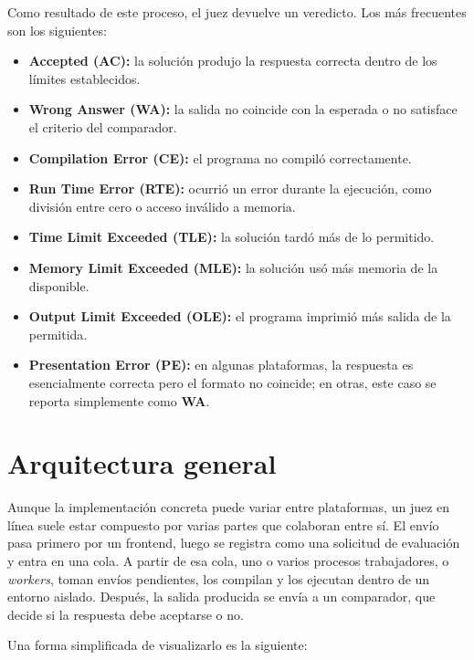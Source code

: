 Como resultado de este proceso, el juez devuelve un veredicto. Los más frecuentes son los siguientes:
\begin{itemize}
    \item \textbf{Accepted (AC):} la solución produjo la respuesta correcta dentro de los límites establecidos.
    \item \textbf{Wrong Answer (WA):} la salida no coincide con la esperada o no satisface el criterio del comparador.
    \item \textbf{Compilation Error (CE):} el programa no compiló correctamente.
    \item \textbf{Run Time Error (RTE):} ocurrió un error durante la ejecución, como división entre cero o acceso inválido a memoria.
    \item \textbf{Time Limit Exceeded (TLE):} la solución tardó más de lo permitido.
    \item \textbf{Memory Limit Exceeded (MLE):} la solución usó más memoria de la disponible.
    \item \textbf{Output Limit Exceeded (OLE):} el programa imprimió más salida de la permitida.
    \item \textbf{Presentation Error (PE):} en algunas plataformas, la respuesta es esencialmente correcta pero el formato no coincide; en otras, este caso se reporta simplemente como \textbf{WA}.
\end{itemize}

\section{Arquitectura general}

Aunque la implementación concreta puede variar entre plataformas, un juez en línea suele estar compuesto por varias partes que colaboran entre sí. El envío pasa primero por un frontend, luego se registra como una solicitud de evaluación y entra en una cola. A partir de esa cola, uno o varios procesos trabajadores, o \textit{workers}, toman envíos pendientes, los compilan y los ejecutan dentro de un entorno aislado. Después, la salida producida se envía a un comparador, que decide si la respuesta debe aceptarse o no.

Una forma simplificada de visualizarlo es la siguiente:

